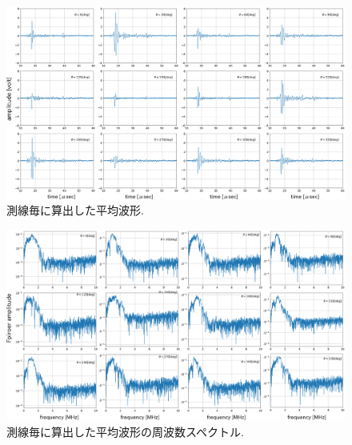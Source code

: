 \begin{figure}[h]
	\begin{center}
	\includegraphics[width=1.0\linewidth]{Figs/fig19.eps} 
	\end{center}
	\caption{
		測線毎に算出した平均波形.
	} 
	\label{fig:fig19}
\end{figure}
\begin{figure}[h]
	\begin{center}
	\includegraphics[width=1.0\linewidth]{Figs/fig20.eps} 
	\end{center}
	\caption{
		測線毎に算出した平均波形の周波数スペクトル.
	} 
	\label{fig:fig20}
\end{figure}
